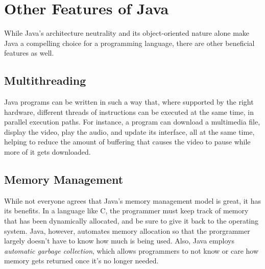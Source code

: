 \section{Other Features of Java}

While Java's architecture neutrality and its object-oriented nature alone make Java a compelling choice for a programming language, there are other beneficial features as well.

\subsection{Multithreading}

Java programs can be written in such a way that, where supported by the right hardware, different threads of instructions can be executed at the same time, in parallel execution paths.  For instance, a program can download a multimedia file, display the video, play the audio, and update its interface, all at the same time, helping to reduce the amount of buffering that causes the video to pause while more of it gets downloaded.

\subsection{Memory Management}

While not everyone agrees that Java's memory management model is great, it has its benefits.  In a language like C, the programmer must keep track of memory that has been dynamically allocated, and be sure to give it back to the operating system.  Java, however, automates memory allocation so that the prorgrammer largely doesn't have to know how much is being used.  Also, Java employs \textit{automatic garbage collection}, which allows programmers to not know or care how memory gets returned once it's no longer needed.
